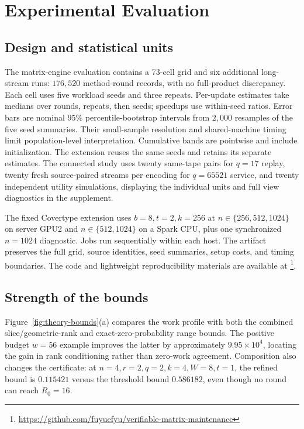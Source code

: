 \section{Experimental Evaluation}\label{sec:evaluation}
\subsection{Design and statistical units}
The matrix-engine evaluation contains a 73-cell grid and six additional
long-stream runs: $176,520$ method-round records, with no full-product
discrepancy. Each cell uses five workload seeds and three repeats.
Per-update estimates take medians over rounds, repeats, then seeds;
speedups use within-seed ratios. Error bars are nominal $95\%$
percentile-bootstrap intervals from $2,000$ resamples of the five seed
summaries. Their small-sample resolution and shared-machine timing limit
population-level interpretation. Cumulative bands are pointwise and
include initialization. The extension reuses the same seeds and retains
its separate estimates. The connected study uses twenty same-tape pairs
for $q=17$ replay, twenty fresh source-paired streams per encoding for
$q=65521$ service, and twenty independent utility simulations, displaying
the individual units and full view diagnostics in the supplement.

The fixed Covertype extension uses $b=8,t=2,k=256$ at
$n\in\{256,512,1024\}$ on server GPU2 and $n\in\{512,1024\}$ on a
Spark CPU, plus one synchronized $n=1024$ diagnostic. Jobs run
sequentially within each host. The artifact preserves the full grid,
source identities, seed summaries, setup costs, and timing boundaries.
The code and lightweight reproducibility materials are available at
\footnote{\url{https://github.com/fuyuefyu/verifiable-matrix-maintenance}}.

\subsection{Strength of the bounds}
Figure~\ref{fig:theory-bounds}(a) compares the work profile with both
the combined slice/geometric-rank and exact-zero-probability range bounds. The positive
budget $w=56$ example improves the latter by approximately
$9.95\times10^4$, locating the gain in rank conditioning rather than
zero-work agreement. Composition also changes the certificate:
at $n=4,r=2,q=2,k=4,W=8,t=1$, the refined bound is $0.115421$ versus
the threshold bound $0.586182$, even though no round can reach $R_0=16$.

